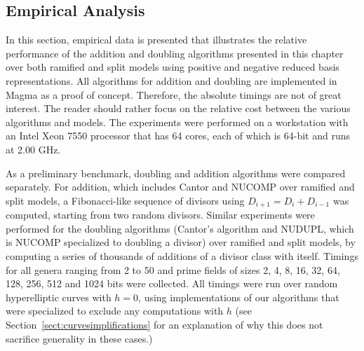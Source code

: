 \subsection{Empirical Analysis}\label{sec:numerical} 
In this section, empirical data is presented that illustrates the relative
performance of the addition and doubling algorithms presented in this chapter
over both ramified and split models using positive and negative reduced basis
representations. All algorithms for addition and doubling are
implemented in Magma as a proof of concept. Therefore, the absolute timings are
not of great interest. The reader should rather focus on the relative cost
between the various algorithms and models. The experiments were performed on a
workstation with an Intel Xeon 7550 processor that has 64 cores, each of which
is 64-bit and runs at 2.00 GHz.

As a preliminary benchmark, doubling and addition algorithms were compared
separately. For addition, which includes Cantor and NUCOMP over ramified and
split models, a Fibonacci-like sequence of divisors using $D_{i+1} = D_{i} +
D_{i-1}$ was computed, starting from two random divisors. Similar experiments
were performed for the doubling algorithms (Cantor's algorithm and NUDUPL, which
is NUCOMP specialized to doubling a divisor) over ramified and split models, by
computing a series of thousands of additions of a divisor class with itself.
Timings for all genera ranging from  2 to 50 and prime fields of sizes 2, 4, 8,
16, 32, 64, 128, 256, 512 and 1024 bits were collected. All timings were run
over random hyperelliptic curves with $h=0$, using implementations of our
algorithms that were specialized to exclude any computations with $h$ (see
Section~\ref{sect:curvesimplifications} for an explanation of why this does not
sacrifice generality in these cases.)

